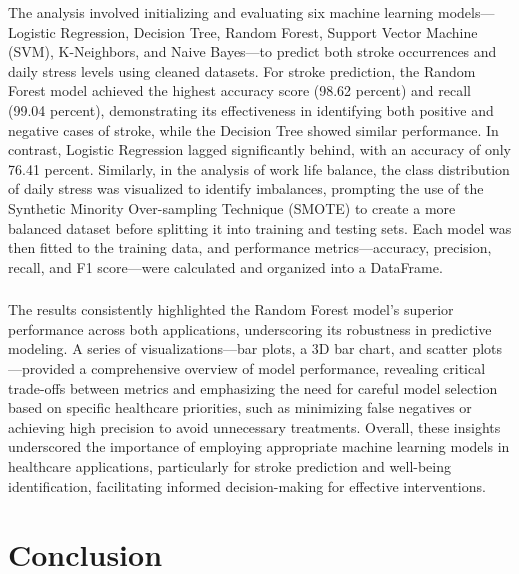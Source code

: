 \documentclass[runningheads]{llncs}
\begin{document}
\begin{enumerate}
The analysis involved initializing and evaluating six machine learning models—Logistic Regression, Decision Tree, Random Forest, Support Vector Machine (SVM), K-Neighbors, and Naive Bayes—to predict both stroke occurrences and daily stress levels using cleaned datasets. For stroke prediction, the Random Forest model achieved the highest accuracy score (98.62 percent) and recall (99.04 percent), demonstrating its effectiveness in identifying both positive and negative cases of stroke, while the Decision Tree showed similar performance. In contrast, Logistic Regression lagged significantly behind, with an accuracy of only 76.41 percent. Similarly, in the analysis of work life balance, the class distribution of daily stress was visualized to identify imbalances, prompting the use of the Synthetic Minority Over-sampling Technique (SMOTE) to create a more balanced dataset before splitting it into training and testing sets. Each model was then fitted to the training data, and performance metrics—accuracy, precision, recall, and F1 score—were calculated and organized into a DataFrame. 

\subsubsection{}

The results consistently highlighted the Random Forest model's superior performance across both applications, underscoring its robustness in predictive modeling. A series of visualizations—bar plots, a 3D bar chart, and scatter plots—provided a comprehensive overview of model performance, revealing critical trade-offs between metrics and emphasizing the need for careful model selection based on specific healthcare priorities, such as minimizing false negatives or achieving high precision to avoid unnecessary treatments. Overall, these insights underscored the importance of employing appropriate machine learning models in healthcare applications, particularly for stroke prediction and well-being identification, facilitating informed decision-making for effective interventions.

\section{Conclusion}


\end{enumerate}
\end{document}
